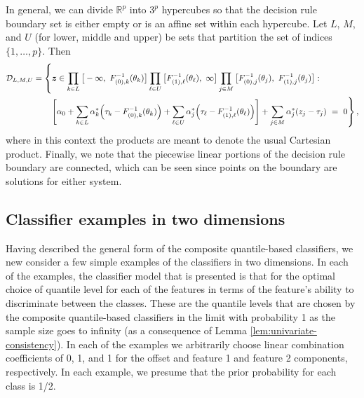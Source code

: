 In general, we can divide $\mathbb{R}^p$ into $3^p$ hypercubes so that the
decision rule boundary set is either empty or is an affine set within each
hypercube.  Let $L$, $M$, and $U$ (for lower, middle and upper) be sets that
partition the set of indices $\{1, \dots, p\}$.  Then
\begin{equation}
  \label{eq:composite-classifiers-general}
  \begin{split}
    \mathcal{D}_{L,M,U} = \left\{
      \vec{z} \in
      \prod_{k \in L} \big[ -\infty,~ F_{(0),k}^{-1}(\theta_k) \big]
      \prod_{\ell \in U} \big[ F_{(1),\ell}^{-1}(\theta_{\ell}),~ \infty \big]
      \prod_{j \in M} \big[ F_{(0),j}^{-1}(\theta_j),~ F_{(1),j}^{-1}(\theta_j) \big] :
      \phantom{\hspace{15mm}}
    \right.  \\
    \left.
      \left[
        \alpha_0 + 
        \sum_{k \in L} \alpha_k^{*} \Big(\tau_k - F_{(0),k}^{-1}(\theta_k)\Big) +
        \sum_{\ell \in U} \alpha_j^{*} \Big(\tau_{\ell} - F_{(1),\ell}^{-1}(\theta_{\ell})\Big)
      \right] +
        \sum_{j \in M} \alpha_j^{*} (z_j - \tau_j) ~=~ 0
    \right\} ,
  \end{split}
\end{equation}
where in this context the products are meant to denote the usual Cartesian
product.  Finally, we note that the piecewise linear portions of the decision
rule boundary are connected, which can be seen since points on the boundary are
solutions for either system.


\subsection{Classifier examples in two dimensions}
\label{sec:classifier-examples}

Having described the general form of the composite quantile-based classifiers,
we new consider a few simple examples of the classifiers in two dimensions.  In
each of the examples, the classifier model that is presented is that for the
optimal choice of quantile level for each of the features in terms of the
feature's ability to discriminate between the classes.  These are the quantile
levels that are chosen by the composite quantile-based classifiers in the limit
with probability 1 as the sample size goes to infinity (as a consequence of
Lemma \ref{lem:univariate-consistency}).  In each of the examples we arbitrarily
choose linear combination coefficients of 0, 1, and 1 for the offset and feature
1 and feature 2 components, respectively.  In each example, we presume that the
prior probability for each class is 1/2.


